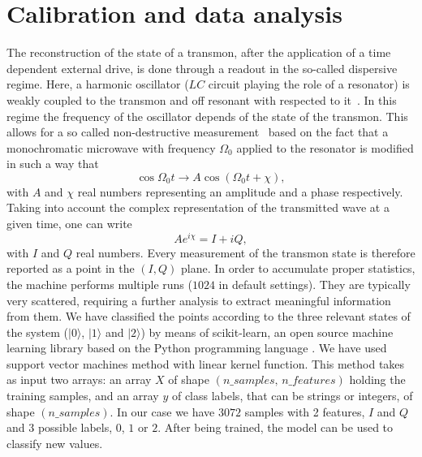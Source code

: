 \documentclass[12pt]{iopart}
\begin{document}
\section{Calibration and data analysis}
\label{sec:calibration}
The reconstruction of the state of a transmon,  after the application of a time dependent external drive, is done through a readout in the so-called dispersive regime. Here, a harmonic oscillator ($LC$ circuit playing the role of a resonator) is weakly coupled to the transmon and off resonant with respected to it~\cite{Krantz19}. In this regime the frequency of the oscillator depends of the state of the transmon. This allows for a so called non-destructive measurement~\cite{Jeffrey14} based on the fact that a monochromatic microwave with frequency $\Omega_{0}$ applied to the
resonator is modified in such a way that
\begin{equation}
\cos{\Omega_{0} t} \rightarrow A \cos(\Omega_{0} t + \chi), 
\end{equation}
with $A$ and $\chi$ real numbers representing an amplitude and a phase respectively.  
Taking into account the complex representation of the transmitted wave at a given time, one can write
\begin{equation}
Ae^{i \chi} = I + iQ,
\end{equation}
with $I$ and $Q$ real numbers. Every measurement of the transmon state is therefore reported as a point in the $(I,Q)$ plane. In order to accumulate proper statistics, the machine performs multiple runs ($1024$ in default settings). They are typically very scattered, requiring a further analysis to extract meaningful information from them. 
We have classified the points according to the three relevant states of the system ($|0\rangle$, $|1\rangle$ and $|2\rangle$) by means of scikit-learn, an open source machine learning library based on the Python programming language \cite{scikit-learn}. We have used support vector machines method with linear kernel function. This method takes as input two arrays: an array $X$ of shape $(n\_samples, \,n\_features)$ holding the training samples, and an array $y$ of class labels, that can be strings or integers, of shape $(n\_samples)$. In our case we have $3072$ samples with 2 features, $I$ and $Q$ and $3$ possible labels, $0$, $1$ or $2$.  After being trained, the model can be used to classify new values.
\end{document}
